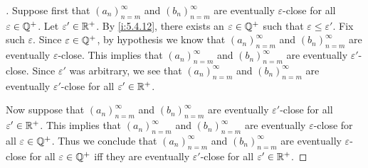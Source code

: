 \begin{proof}[]
  Suppose first that \((a_n)_{n = m}^\infty\) and \((b_n)_{n = m}^\infty\) are eventually \(\varepsilon\)-close for all \(\varepsilon \in \mathbb{Q}^+\).
  Let \(\varepsilon' \in \mathbb{R}^+\).
  By \cref{i:5.4.12}, there exists an \(\varepsilon \in \mathbb{Q}^+\) such that \(\varepsilon \leq \varepsilon'\).
  Fix such \(\varepsilon\).
  Since \(\varepsilon \in \mathbb{Q}^+\), by hypothesis we know that \((a_n)_{n = m}^\infty\) and \((b_n)_{n = m}^\infty\) are eventually \(\varepsilon\)-close.
  This implies that \((a_n)_{n = m}^\infty\) and \((b_n)_{n = m}^\infty\) are eventually \(\varepsilon'\)-close.
  Since \(\varepsilon'\) was arbitrary, we see that \((a_n)_{n = m}^\infty\) and \((b_n)_{n = m}^\infty\) are eventually \(\varepsilon'\)-close for all \(\varepsilon' \in \mathbb{R}^+\).

  Now suppose that \((a_n)_{n = m}^\infty\) and \((b_n)_{n = m}^\infty\) are eventually \(\varepsilon'\)-close for all \(\varepsilon' \in \mathbb{R}^+\).
  This implies that \((a_n)_{n = m}^\infty\) and \((b_n)_{n = m}^\infty\) are eventually \(\varepsilon\)-close for all \(\varepsilon \in \mathbb{Q}^+\).
  Thus we conclude that \((a_n)_{n = m}^\infty\) and \((b_n)_{n = m}^\infty\) are eventually \(\varepsilon\)-close for all \(\varepsilon \in \mathbb{Q}^+\) iff they are eventually \(\varepsilon'\)-close for all \(\varepsilon' \in \mathbb{R}^+\).
\end{proof}
